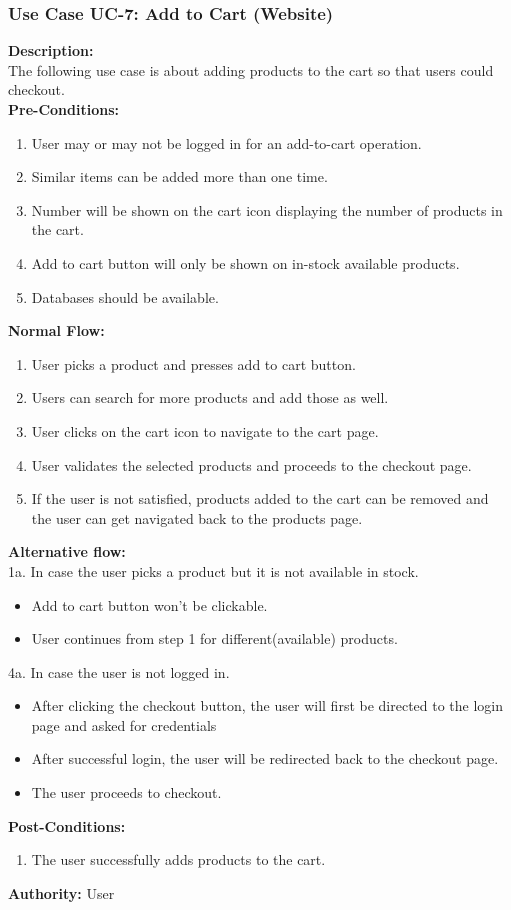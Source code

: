 \subsubsection{Use Case UC-7: Add to Cart (Website)}
\textbf{Description:}\\
The following use case is about adding products to the cart so that users could checkout.
\\
\textbf{Pre-Conditions:}
\begin{enumerate}
    \item User may or may not be logged in for an add-to-cart operation.
 \item Similar items can be added more than one time. 
 \item Number will be shown on the cart icon displaying the number of products in the cart.
 \item Add to cart button will only be shown on in-stock available products.
 \item Databases should be available.\end{enumerate}
\textbf{Normal Flow:}\\
\begin{enumerate}
\item User picks a product and presses add to cart button. 
\item Users can search for more products and add those as well. 
\item User clicks on the cart icon to navigate to the cart page. 
\item User validates the selected products and proceeds to the checkout page. 
\item If the user is not satisfied, products added to the cart can be removed and the user can get navigated back to the products page. 
\end{enumerate}
\textbf{Alternative flow:}\\ 
1a. In case the user picks a product but it is not available in stock. 
\begin{itemize}
    \item Add to cart button won't be clickable.  
  \item   User continues from step 1 for different(available) products.
\end{itemize}	
4a. In case the user is not logged in.
\begin{itemize}
    \item 	After clicking the checkout button, the user will first be directed to the login page and asked for credentials
    \item After successful login, the user will be redirected back to the checkout page.
    \item The user proceeds to checkout.
\end{itemize}	
\textbf{Post-Conditions: }
\begin{enumerate}
\item	The user successfully adds products to the cart.
\end{enumerate}
\textbf{Authority:}
User

